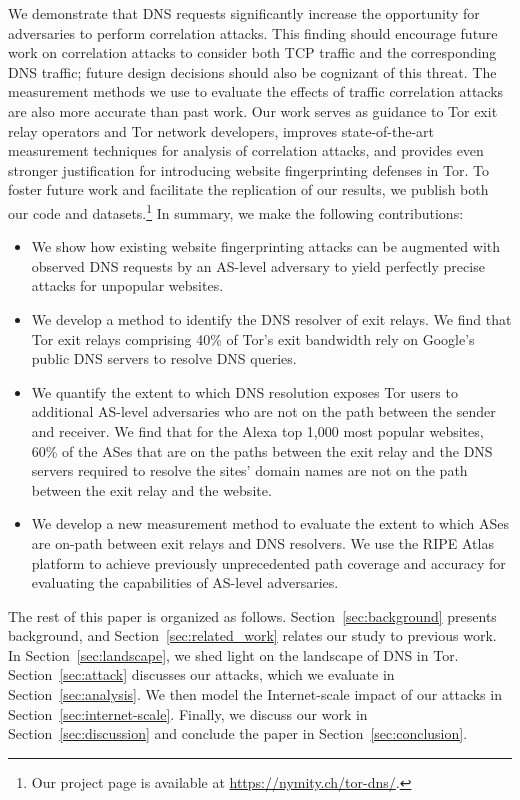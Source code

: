 We demonstrate that DNS requests significantly increase the opportunity
for adversaries to perform correlation attacks. This finding should
encourage future work on correlation attacks to consider both TCP
traffic and the corresponding DNS traffic; future design decisions
should also be cognizant of this threat.  The measurement methods we use
to evaluate the effects of traffic correlation attacks are also more
accurate than past work. Our work \first serves as guidance to Tor exit
relay operators and Tor network developers, \second improves
state-of-the-art measurement techniques for analysis of correlation attacks, and \third
provides even stronger justification for introducing website fingerprinting defenses in
Tor.  To foster future work and facilitate the replication of
our results, we publish both our code and datasets.\footnote{Our project page is
available at \url{https://nymity.ch/tor-dns/}.}
In summary, we make the following contributions:
\begin{itemize}

\item We show how existing website fingerprinting attacks can be
  augmented with observed DNS requests by an AS-level adversary to
  yield perfectly precise \name attacks for unpopular websites.

\item We develop a method to identify the DNS resolver of exit
  relays. We find that Tor exit relays comprising 40\% of Tor's exit
  bandwidth rely on Google's public DNS servers to resolve DNS queries.

\item We quantify the extent to which DNS resolution exposes Tor users
  to additional AS-level adversaries who are not on the path between the
  sender and receiver.  We find that for the Alexa top 1,000 most
  popular websites, 60\% of the ASes that are on the paths between the
  exit relay and the DNS servers required to resolve the sites' domain
  names are not on the path between the exit relay and the website.

\item We develop a new measurement method to evaluate the extent to
  which ASes are on-path between exit relays and DNS resolvers. We use
  the RIPE Atlas~\cite{atlas} platform to achieve previously
  unprecedented path coverage and accuracy for evaluating the
  capabilities of AS-level adversaries.
\end{itemize}
\noindent
The rest of this paper is organized as follows.
Section~\ref{sec:background} presents background, and
Section~\ref{sec:related_work} relates our study to previous work.  In
Section~\ref{sec:landscape}, we shed light on the landscape of DNS in
Tor.  Section~\ref{sec:attack} discusses our \name attacks, which we
evaluate in Section~\ref{sec:analysis}.  We then model the
Internet-scale impact of our attacks in
Section~\ref{sec:internet-scale}.  Finally, we discuss our work in
Section~\ref{sec:discussion} and conclude the paper in
Section~\ref{sec:conclusion}.
